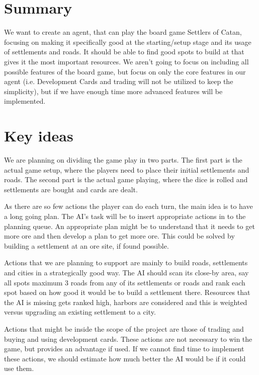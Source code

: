 \section*{Summary}
  We want to create an agent, that can play the board game Settlers of Catan, focusing on making it specifically good at the starting/setup stage and its usage of settlements and roads. It should be able to find good spots to build at that gives it the most important resources. We aren't going to focus on including all possible features of the board game, but focus on only the core features in our agent (i.e. Development Cards and trading will not be utilized to keep the simplicity), but if we have enough time more advanced features will be implemented.

\section*{Key ideas}
We are planning on dividing the game play in two parts. The first part is the actual game setup, where the players need to place their initial settlements and roads. The second part is the actual game playing, where the dice is rolled and settlements are bought and cards are dealt.

As there are so few actions the player can do each turn, the main idea is to have a long going plan. The AI's task will be to insert appropriate actions in to the planning queue. An appropriate plan might be to understand that it needs to get more ore and then develop a plan to get more ore. This could be solved by building a settlement at an ore site, if found possible.

Actions that we are planning to support are mainly to build roads, settlements and cities in a strategically good way. The AI should scan its close-by area, say all spots maximum 3 roads from any of its settlements or roads and rank each spot based on how good it would be to build a settlement there. Resources that the AI is missing gets ranked high, harbors are considered and this is weighted versus upgrading an existing settlement to a city.

Actions that might be inside the scope of the project are those of trading and buying and using development cards. These actions are not necessary to win the game, but provides an advantage if used. If we cannot find time to implement these actions, we should estimate how much better the AI would be if it could use them.

